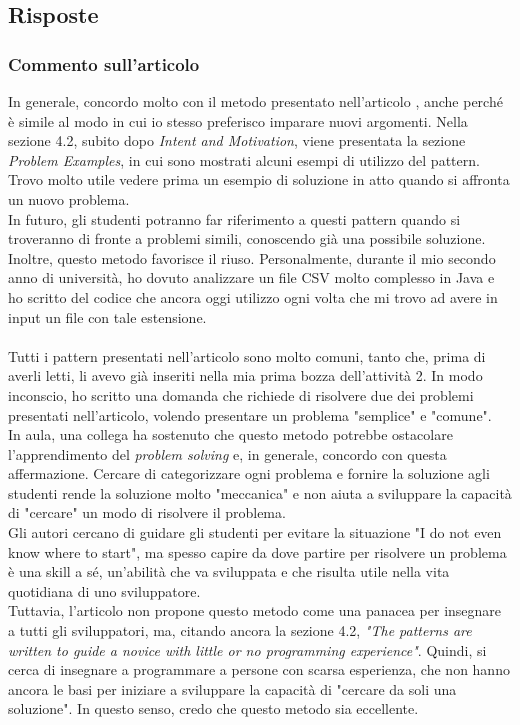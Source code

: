 \documentclass[a4paper]{article}
\begin{document}
\subsection{Risposte}
\subsubsection{Commento sull'articolo}
In generale, concordo molto con il metodo presentato nell'articolo \cite{articolo}, anche perché è simile al modo in cui io stesso preferisco imparare nuovi argomenti.
Nella sezione 4.2, subito dopo \textit{Intent and Motivation}, viene presentata la sezione \textit{Problem Examples}, in cui sono mostrati alcuni esempi di utilizzo del pattern.
Trovo molto utile vedere prima un esempio di soluzione in atto quando si affronta un nuovo problema.\\

In futuro, gli studenti potranno far riferimento a questi pattern quando si troveranno di fronte a problemi simili, conoscendo già una possibile soluzione.
Inoltre, questo metodo favorisce il riuso.
Personalmente, durante il mio secondo anno di università, ho dovuto analizzare un file CSV molto complesso in Java e ho scritto del codice che ancora oggi utilizzo ogni volta che mi trovo ad avere in input un file con tale estensione.\\\\
Tutti i pattern presentati nell'articolo sono molto comuni, tanto che, prima di averli letti, li avevo già inseriti nella mia prima bozza dell'attività 2. In modo inconscio, ho scritto una domanda che richiede di risolvere due dei problemi presentati nell'articolo, volendo presentare un problema "semplice" e "comune".\\

In aula, una collega ha sostenuto che questo metodo potrebbe ostacolare l'apprendimento del \textit{problem solving} e, in generale, concordo con questa affermazione.
Cercare di categorizzare ogni problema e fornire la soluzione agli studenti rende la soluzione molto "meccanica" e non aiuta a sviluppare la capacità di "cercare" un modo di risolvere il problema.\\
Gli autori cercano di guidare gli studenti per evitare la situazione "I do not even know where to start", ma spesso capire da dove partire per risolvere un problema è una skill a sé, un'abilità che va sviluppata e che risulta utile nella vita quotidiana di uno sviluppatore.\\

Tuttavia, l'articolo non propone questo metodo come una panacea per insegnare a tutti gli sviluppatori, ma, citando ancora la sezione 4.2, \textit{"The patterns are written to guide a novice with little or no programming experience"}.
Quindi, si cerca di insegnare a programmare a persone con scarsa esperienza, che non hanno ancora le basi per iniziare a sviluppare la capacità di "cercare da soli una soluzione". In questo senso, credo che questo metodo sia eccellente.
\end{document}

